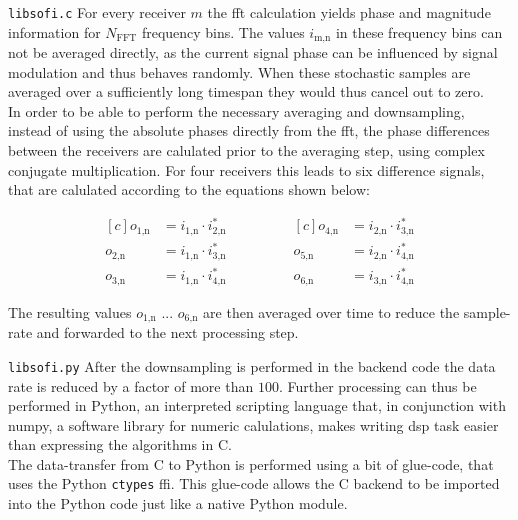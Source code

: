 \begin{subchapter}{\texttt{libsofi.c}}
  For every receiver $m$ the \gls{fft} calculation yields phase
  and magnitude information for $N_\text{FFT}$ frequency bins.
  The values $i_\text{m,n}$ in these frequency bins can not
  be averaged directly, as the current signal phase can be
  influenced by signal modulation and thus behaves randomly.
  When these stochastic samples are averaged over a sufficiently long
  timespan they would thus cancel out to zero. \\


  In order to be able to perform the necessary averaging
  and downsampling, instead of using the absolute phases
  directly from the \gls{fft}, the phase differences between the receivers
  are calulated prior to the averaging step, using complex conjugate multiplication.
  For four receivers this leads to six difference signals,
  that are calulated according to the equations shown below:

  \begin{equation*}
    \begin{aligned}[c]
      o_\text{1,n}&= i_\text{1,n} \cdot i_\text{2,n}^{\ast} \\
      o_\text{2,n}&= i_\text{1,n} \cdot i_\text{3,n}^{\ast} \\
      o_\text{3,n}&= i_\text{1,n} \cdot i_\text{4,n}^{\ast}
    \end{aligned}
    \qquad \qquad
    \begin{aligned}[c]
      o_\text{4,n}&= i_\text{2,n} \cdot i_\text{3,n}^{\ast} \\
      o_\text{5,n}&= i_\text{2,n} \cdot i_\text{4,n}^{\ast} \\
      o_\text{6,n}&= i_\text{3,n} \cdot i_\text{4,n}^{\ast}
    \end{aligned}
  \end{equation*}

  The resulting values $o_\text{1,n}$ ... $o_\text{6,n}$
  are then averaged over time to reduce the sample-rate
  and forwarded to the next processing step.
\end{subchapter}

\begin{subchapter}{\texttt{libsofi.py}}
  After the downsampling is performed in the backend code
  the data rate is reduced by a factor of more than $100$. Further processing
  can thus be performed in Python, an interpreted scripting
  language that, in conjunction with numpy, a software library for
  numeric calulations, makes writing \acrshort{dsp} task easier
  than expressing the algorithms in C. \\

  The data-transfer from C to Python is performed using
  a bit of glue-code, that uses the Python \texttt{ctypes}
  \gls{ffi}.
  This glue-code allows the C backend to be imported
  into the Python code just like a native Python module.
\end{subchapter}

